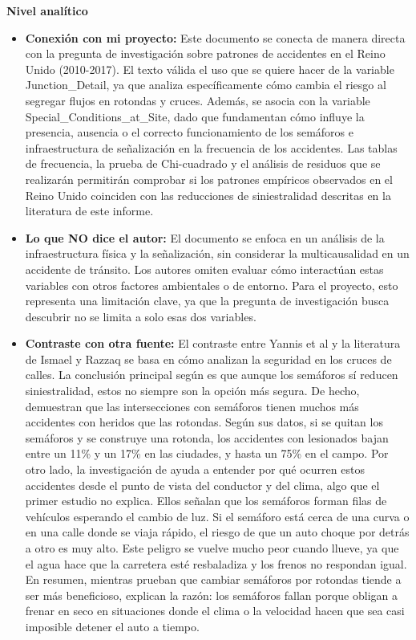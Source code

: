 \documentclass[12pt]{article}
\begin{document}
\textbf{Nivel analítico}

\begin{itemize}
    \item \textbf{Conexión con mi proyecto:}  Este documento se conecta de manera 
    directa con la pregunta de investigación sobre patrones de accidentes en el 
    Reino Unido (2010-2017). El texto válida el uso que se quiere hacer de la 
    variable Junction\_Detail, ya que analiza específicamente cómo cambia el riesgo 
    al segregar flujos en rotondas y cruces. Además, se asocia con la variable 
    Special\_Conditions\_at\_Site, dado que fundamentan cómo influye la presencia, 
    ausencia o el correcto funcionamiento de los semáforos e infraestructura de 
    señalización en la frecuencia de los accidentes. Las tablas de frecuencia, 
    la prueba de Chi-cuadrado y el análisis de residuos que se realizarán permitirán 
    comprobar si los patrones empíricos observados en el Reino Unido coinciden con 
    las reducciones de siniestralidad descritas en la literatura de este informe.\\
    

	\item \textbf{Lo que NO dice el autor:}  El documento se enfoca en un análisis de la 
	infraestructura física y la señalización, sin considerar la multicausalidad en un 
	accidente de tránsito. Los autores omiten evaluar cómo interactúan estas variables
	con otros factores ambientales o de entorno. Para el proyecto, esto representa una 
	limitación clave, ya que la pregunta de investigación busca descubrir no se limita 
	a solo esas dos variables.\\
	
	\item \textbf{Contraste con otra fuente:}  El contraste entre Yannis et al
	y la literatura de Ismael y Razzaq se basa en cómo analizan la seguridad en los 
	cruces de calles. La conclusión principal según \textcite{yannis_effectiveness_junctions} 
	es que aunque los semáforos sí reducen siniestralidad, estos no siempre 
	son la opción más segura. De hecho, demuestran que las intersecciones con 
	semáforos tienen muchos más accidentes con heridos que las rotondas. Según 
	sus datos, si se quitan los semáforos y se construye una rotonda, los accidentes 
	con lesionados bajan entre un 11\% y un 17\% en las ciudades, y hasta un 75\% en 
	el campo. Por otro lado, la investigación de \textcite{KARZAN2017} 
	ayuda a entender por qué ocurren estos accidentes desde el punto de vista del 
	conductor y del clima, algo que el primer estudio no explica. Ellos señalan que 
	los semáforos forman filas de vehículos esperando el cambio de luz. Si el 
	semáforo está cerca de una curva o en una calle donde se viaja rápido, el 
	riesgo de que un auto choque por detrás a otro es muy alto. Este peligro se 
	vuelve mucho peor cuando llueve, ya que el agua hace que la carretera 
	esté resbaladiza y los frenos no respondan igual. En resumen, mientras \textcite{yannis_effectiveness_junctions} prueban que cambiar semáforos por 
	rotondas tiende a ser más beneficioso, \textcite{KARZAN2017} explican 
	la razón: los semáforos fallan porque obligan a frenar en seco en situaciones 
	donde el clima o la velocidad hacen que sea casi imposible detener el auto a 
	tiempo.


\end{itemize}
\end{document}
